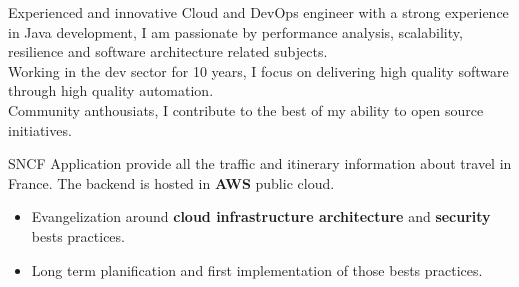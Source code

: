 \documentclass[10pt,a4paper,ragged2e]{altacv}
\begin{document}

\begin{fullwidth}
\makecvheader
\end{fullwidth}

	\quad Experienced and innovative Cloud and DevOps engineer with a strong experience in Java development, I am passionate by performance analysis, scalability, resilience and software architecture related subjects. 
	\\
	\medskip
	\quad Working in the dev sector for 10 years, I focus on delivering high quality software through high quality automation. 
	\\
	\medskip
	\quad Community anthousiats, I contribute to the best of my ability to open source initiatives.
	


\bigskip
{}
		
		SNCF Application provide all the traffic and itinerary information about travel in France. The backend is hosted in \textbf{AWS} public cloud.
		
		\medskip
		\begin{itemize}	
			\item Evangelization around \textbf{cloud infrastructure architecture} and \textbf{security} bests practices.
			\item Long term planification and first implementation of those bests practices.
		\end{itemize}
	\divider
\end{document}
